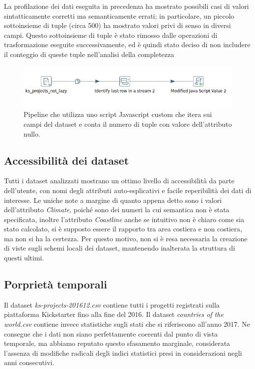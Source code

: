 La profilazione dei dati eseguita in precedenza ha mostrato possibili casi di valori sintatticamente corretti ma semanticamente errati; in particolare, un piccolo sottoinsieme di tuple (circa 500) ha mostrato valori privi di senso in diversi campi. Questo sottoinsieme di tuple è stato rimosso dalle operazioni di trasformazione eseguite successivamente, ed è quindi stato deciso di non includere il conteggio di queste tuple nell'analisi della completezza

\begin{figure}
	\centering
	\includegraphics[width=0.7\linewidth]{images/DQ_completezza}
	\caption{Pipeline che utilizza uno script Javascript custom che itera sui campi del dataset e conta il numero di tuple con valore dell'attributo nullo.}
	\label{fig:dqcompletezza}
\end{figure}

\newpage
\subsection{Accessibilità dei dataset}
Tutti i dataset analizzati mostrano un ottimo livello di accessibilità da parte dell'utente, con nomi degli attributi auto-esplicativi e facile reperibilità dei dati di interesse. 
Le uniche note a margine di quanto appena detto sono i valori dell'attributo \textit{Climate}, poiché sono dei numeri la cui semantica non è stata specificata, inoltre l'attributo \textit{Coastline} anche se intuitivo non è chiaro come sia stato calcolato, si è supposto essere il rapporto tra area costiera e non costiera, ma non si ha la certezza.
Per questo motivo, non si è resa necessaria la creazione di viste sugli schemi locali dei dataset, mantenendo inalterata la struttura di questi ultimi.

\subsection{Porprietà temporali}
\label{subsec:temporali}
Il dataset \textit{ks-projects-201612.csv} contiene tutti i progetti registrati sulla piattaforma Kickstarter fino alla fine del 2016. Il dataset \textit{countries of the world.csv} contiene invece statistiche sugli stati che si riferiscono all'anno 2017. Ne consegue che i dati non siano perfettamente coerenti dal punto di vista temporale, ma abbiamo reputato questo sfasamento marginale, considerata l'assenza di modifiche radicali degli indici statistici presi in considerazioni negli anni consecutivi.

